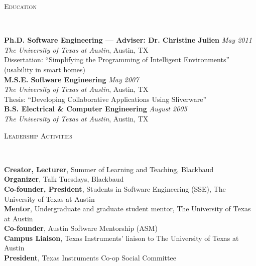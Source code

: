 \documentclass[9pt]{article}
\newenvironment{changemargin}[2]{%
  \begin{list}{}{%
    \setlength{\topsep}{0pt}%
    \setlength{\leftmargin}{#1}%
    \setlength{\rightmargin}{#2}%
    \setlength{\listparindent}{\parindent}%
    \setlength{\itemindent}{\parindent}%
    \setlength{\parsep}{\parskip}%
  }%
  \item[]}{\end{list}
}
\newcommand{\lineover}{
	\begin{changemargin}{-0.05in}{-0.05in}
		\vspace*{-8pt}
		\hrulefill \\
		\vspace*{-2pt}
	\end{changemargin}
}
\newcommand{\header}[1]{
	\begin{changemargin}{-0.5in}{-0.5in}
		\scshape{#1}\\
  	\lineover
	\end{changemargin}
}
\newenvironment{body} {
	\vspace*{-16pt}
	\begin{changemargin}{-0.25in}{-0.5in}
  }	
	{\end{changemargin}
}
\begin{document}
\medskip


\header{Education}

\begin{body}
	\vspace{14pt}
	\textbf{Ph.D. Software Engineering --- Adviser: Dr. Christine Julien}{} \hfill \emph{May 2011}{} \\
	\emph{The University of Texas at Austin}, Austin, TX{} \\
	Dissertation: ``Simplifying the Programming of Intelligent Environments'' (usability in smart homes)\\
  \medskip
	\textbf{M.S.E. Software Engineering}{} \hfill \emph{May 2007}{} \\
	\emph{The University of Texas at Austin}, Austin, TX{} \\
	Thesis: ``Developing Collaborative Applications Using Sliverware''\\
  \medskip
	\textbf{B.S. Electrical \& Computer Engineering} \hfill \emph{August 2005} \\
	\emph{The University of Texas at Austin}, Austin, TX\\
\end{body}

\medskip


\header{Leadership Activities}

\begin{body}
	\vspace{14pt}
	\textbf{Creator, Lecturer}, Summer of Learning and Teaching, Blackbaud\\
	\medskip
	\textbf{Organizer}, Talk Tuesdays, Blackbaud\\
	\medskip
	\textbf{Co-founder, President}, Students in Software Engineering (SSE), The University of Texas at Austin\\
	\medskip
	\textbf{Mentor}, Undergraduate and graduate student mentor, The University of Texas at Austin\\
	\medskip
	\textbf{Co-founder}, Austin Software Mentorship (ASM)\\
	\medskip
	\textbf{Campus Liaison}, Texas Instruments' liaison to The University of Texas at Austin\\
	\medskip
	\textbf{President}, Texas Instruments Co-op Social Committee\\
\end{body}
\end{document}
